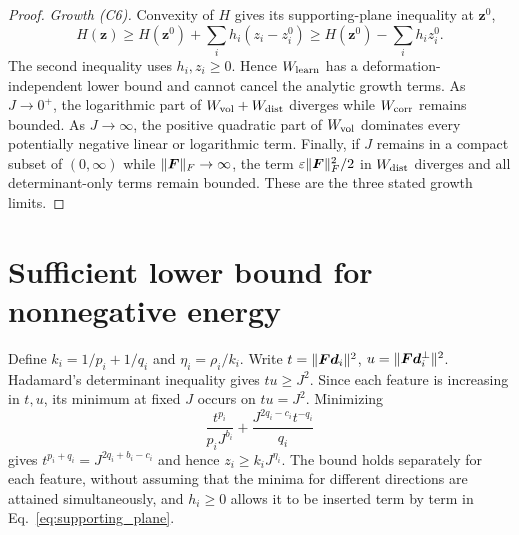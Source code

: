 \begin{proof}
\emph{Growth (C6).}
Convexity of $H$ gives its supporting-plane inequality at $\bm z^0$,
\begin{equation}
 H(\bm z)\geq H(\bm z^0)+\sum_i h_i(z_i-z_i^0)
 \geq H(\bm z^0)-\sum_i h_i z_i^0.
 \label{eq:supporting_plane}
\end{equation}
The second inequality uses $h_i,z_i\geq0$. Hence $W_{\rm learn}$ has a deformation-independent lower bound and cannot cancel the analytic growth terms. As $J\to0^+$, the logarithmic part of $W_{\rm vol}+W_{\rm dist}$ diverges while $W_{\rm corr}$ remains bounded. As $J\to\infty$, the positive quadratic part of $W_{\rm vol}$ dominates every potentially negative linear or logarithmic term. Finally, if $J$ remains in a compact subset of $(0,\infty)$ while $\|\bm F\|_F\to\infty$, the term $\varepsilon\|\bm F\|_F^2/2$ in $W_{\rm dist}$ diverges and all determinant-only terms remain bounded. These are the three stated growth limits.
\end{proof}

\section{Sufficient lower bound for nonnegative energy}
\label{app:nonnegative}
Define $k_i=1/p_i+1/q_i$ and $\eta_i=\rho_i/k_i$. Write $t=\|\bm F\bm d_i\|^2$, $u=\|\bm F\bm d_i^\perp\|^2$. Hadamard's determinant inequality gives $tu\geq J^2$. Since each feature is increasing in $t,u$, its minimum at fixed $J$ occurs on $tu=J^2$. Minimizing
\begin{equation}
 \frac{t^{p_i}}{p_iJ^{b_i}}+\frac{J^{2q_i-c_i}t^{-q_i}}{q_i}
\end{equation}
gives $t^{p_i+q_i}=J^{2q_i+b_i-c_i}$ and hence $z_i\geq k_iJ^{\eta_i}$. The bound holds separately for each feature, without assuming that the minima for different directions are attained simultaneously, and $h_i\geq0$ allows it to be inserted term by term in Eq.~\eqref{eq:supporting_plane}.

